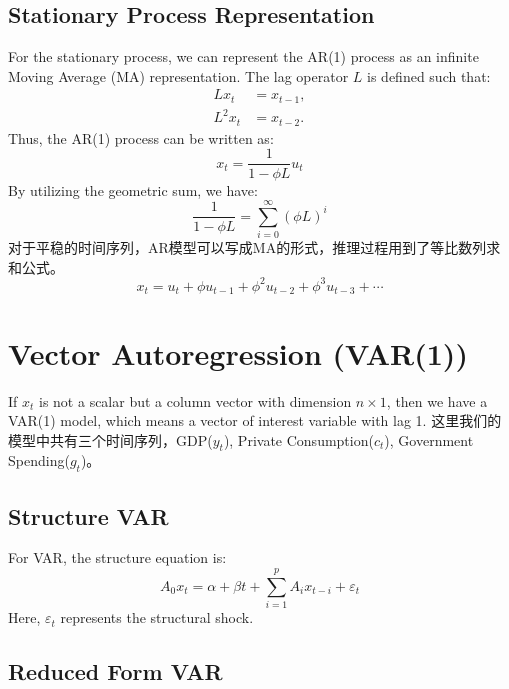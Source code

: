 \documentclass{article}
\begin{document}
\begin{CJK}{UTF8}{gbsn}
\subsection*{Stationary Process Representation}

For the stationary process, we can represent the AR(1) process as an infinite Moving Average (MA) representation. The lag operator $L$ is defined such that:
\begin{align*}
    Lx_t &= x_{t-1}, \\
    L^2x_t &= x_{t-2}.
\end{align*}
Thus, the AR(1) process can be written as:
\begin{equation}
    x_t = \frac{1}{1-\phi L}u_t
\end{equation}
By utilizing the geometric sum, we have:
\begin{equation}
    \frac{1}{1 - \phi L} = \sum_{i=0}^{\infty} (\phi L)^i
\end{equation}
对于平稳的时间序列，AR模型可以写成MA的形式，推理过程用到了等比数列求和公式。 
\begin{equation}
    x_t = u_t + \phi u_{t-1} + \phi^2 u_{t-2} + \phi^3 u_{t-3} + \cdots
\end{equation}

\section*{Vector Autoregression (VAR(1))}

If $x_t$ is not a scalar but a column vector with dimension $n \times 1$, then we have a VAR(1) model, which means a vector of interest variable with lag 1.
这里我们的模型中共有三个时间序列，GDP(\(y_t\)), Private Consumption(\(c_t\)), Government Spending(\(g_t\))。

\subsection*{Structure VAR}

For VAR, the structure equation is:
\begin{equation}
    A_0x_t = \alpha + \beta t + \sum_{i=1}^{p} A_ix_{t-i} + \varepsilon_t
\end{equation}
Here, $\varepsilon_t$ represents the structural shock.

\subsection*{Reduced Form VAR}


\end{CJK}
\end{document}
